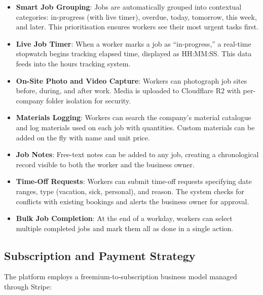 \documentclass[conference]{IEEEtran}
\begin{document}
\begin{itemize}
\item \textbf{Smart Job Grouping}: Jobs are automatically grouped into contextual categories: in-progress (with live timer), overdue, today, tomorrow, this week, and later. This prioritisation ensures workers see their most urgent tasks first.
\item \textbf{Live Job Timer}: When a worker marks a job as ``in-progress,'' a real-time stopwatch begins tracking elapsed time, displayed as HH:MM:SS. This data feeds into the hours tracking system.
\item \textbf{On-Site Photo and Video Capture}: Workers can photograph job sites before, during, and after work. Media is uploaded to Cloudflare R2 with per-company folder isolation for security.
\item \textbf{Materials Logging}: Workers can search the company's material catalogue and log materials used on each job with quantities. Custom materials can be added on the fly with name and unit price.
\item \textbf{Job Notes}: Free-text notes can be added to any job, creating a chronological record visible to both the worker and the business owner.
\item \textbf{Time-Off Requests}: Workers can submit time-off requests specifying date ranges, type (vacation, sick, personal), and reason. The system checks for conflicts with existing bookings and alerts the business owner for approval.
\item \textbf{Bulk Job Completion}: At the end of a workday, workers can select multiple completed jobs and mark them all as done in a single action.
\end{itemize}


\subsection{Subscription and Payment Strategy}

The platform employs a freemium-to-subscription business model managed through Stripe:
\end{document}
